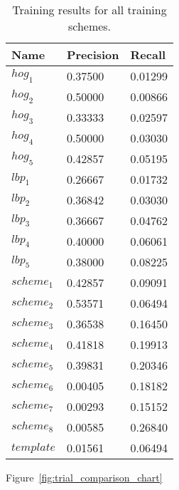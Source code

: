 \documentclass{llncs}
\begin{document}
{		\begin{table}
			\centering
			\caption{Training results for all training schemes.}
			\label{tab:precisionrecall}
			\begin{tabularx}{\textwidth}{XXX}
				\toprule
				\textbf{Name} & \textbf{Precision} & \textbf{Recall} \\
				\midrule
				\(hog_1\)    & 0.37500 & 0.01299 \\
				\(hog_2\)    & 0.50000 & 0.00866 \\
				\(hog_3\)    & 0.33333 & 0.02597 \\
				\(hog_4\)    & 0.50000 & 0.03030 \\
				\(hog_5\)    & 0.42857 & 0.05195 \\
				\(lbp_1\)    & 0.26667 & 0.01732 \\
				\(lbp_2\)    & 0.36842 & 0.03030 \\
				\(lbp_3\)    & 0.36667 & 0.04762 \\
				\(lbp_4\)    & 0.40000 & 0.06061 \\
				\(lbp_5\)    & 0.38000 & 0.08225 \\
				\(scheme_1\) & 0.42857 & 0.09091 \\
				\(scheme_2\) & 0.53571 & 0.06494 \\
				\(scheme_3\) & 0.36538 & 0.16450 \\
				\(scheme_4\) & 0.41818 & 0.19913 \\
				\(scheme_5\) & 0.39831 & 0.20346 \\
				\(scheme_6\) & 0.00405 & 0.18182 \\
				\(scheme_7\) & 0.00293 & 0.15152 \\
				\(scheme_8\) & 0.00585 & 0.26840 \\
				\(template\) & 0.01561 & 0.06494 \\
				\bottomrule
			\end{tabularx}
		\end{table}

		Figure~\ref{fig:trial_comparison_chart}

}
\end{document}
